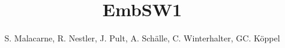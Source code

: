 \documentclass[titlepage=true]{scrartcl}
\title{EmbSW1}
\author{S. Malacarne, R. Nestler, J. Pult, A. Schälle, C.
Winterhalter, GC. Köppel}
\begin{document}
\begin{titlepage}
   \thispagestyle{empty}
   \maketitle
\end{titlepage}

\lstset{style=Csharp}

\tableofcontents \newpage














\end{document}
